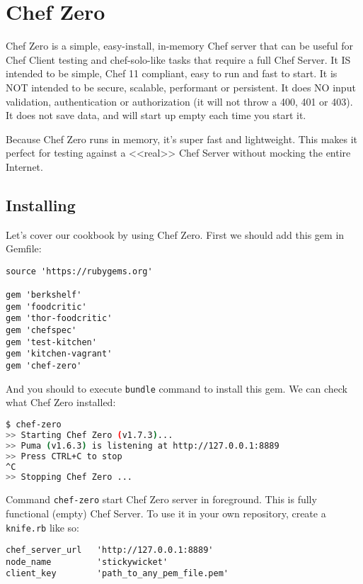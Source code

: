 \section{Chef Zero}
\label{sec:testing-chef-zero}

Chef Zero is a simple, easy-install, in-memory Chef server that can be useful for Chef Client testing and chef-solo-like tasks that require a full Chef Server. It IS intended to be simple, Chef 11 compliant, easy to run and fast to start. It is NOT intended to be secure, scalable, performant or persistent. It does NO input validation, authentication or authorization (it will not throw a 400, 401 or 403). It does not save data, and will start up empty each time you start it.

Because Chef Zero runs in memory, it's super fast and lightweight. This makes it perfect for testing against a <<real>> Chef Server without mocking the entire Internet.

\subsection{Installing}

Let's cover our cookbook by using Chef Zero. First we should add this gem in Gemfile:

\begin{lstlisting}[label=lst:testing-chef-zero1]
source 'https://rubygems.org'

gem 'berkshelf'
gem 'foodcritic'
gem 'thor-foodcritic'
gem 'chefspec'
gem 'test-kitchen'
gem 'kitchen-vagrant'
gem 'chef-zero'
\end{lstlisting}

And you should to execute \lstinline!bundle! command to install this gem. We can check what Chef Zero installed:

\begin{lstlisting}[language=Bash,label=lst:testing-chef-zero2]
$ chef-zero
>> Starting Chef Zero (v1.7.3)...
>> Puma (v1.6.3) is listening at http://127.0.0.1:8889
>> Press CTRL+C to stop
^C
>> Stopping Chef Zero ...
\end{lstlisting}

Command \lstinline!chef-zero! start Chef Zero server in foreground. This is fully functional (empty) Chef Server. To use it in your own repository, create a \lstinline!knife.rb! like so:

\begin{lstlisting}[label=lst:testing-chef-zero3]
chef_server_url   'http://127.0.0.1:8889'
node_name         'stickywicket'
client_key        'path_to_any_pem_file.pem'
\end{lstlisting}

